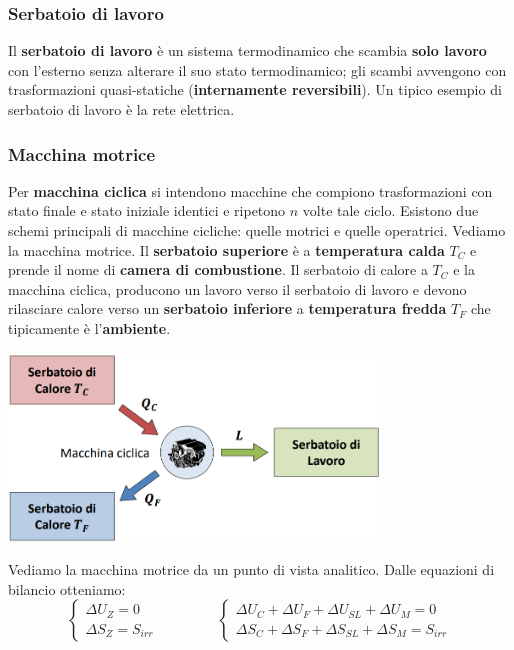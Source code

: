\subsubsection{Serbatoio di lavoro}
Il \textbf{serbatoio di lavoro} è un sistema termodinamico che scambia \textbf{solo lavoro} con l'esterno senza alterare il suo stato termodinamico; gli scambi avvengono con trasformazioni quasi-statiche (\textbf{internamente reversibili}).\newline
\newline
Un tipico esempio di serbatoio di lavoro è la rete elettrica.
\subsubsection{Macchina motrice}
Per \textbf{macchina ciclica} si intendono macchine che compiono trasformazioni con stato finale e stato iniziale identici e ripetono $n$ volte tale ciclo.\newline
\newline
Esistono due schemi principali di macchine cicliche: quelle motrici e quelle operatrici. Vediamo la macchina motrice. \newline
\newline
Il \textbf{serbatoio superiore} è a \textbf{temperatura calda} $T_C$ e prende il nome di \textbf{camera di combustione}.\newline
Il serbatoio di calore a $T_C$ e la macchina ciclica, producono un lavoro verso il serbatoio di lavoro e devono rilasciare calore verso un \textbf{serbatoio inferiore} a \textbf{temperatura fredda} $T_F$ che tipicamente è l'\textbf{ambiente}.
\begin{center}
    \includegraphics[height=5cm]{../L05/img2.PNG}
\end{center}
Vediamo la macchina motrice da un punto di vista analitico.\newline
Dalle equazioni di bilancio otteniamo:
\[
    \begin{cases}
        \Delta U_Z = 0\\ \Delta S_Z = S_{irr}
    \end{cases} \;\;\;\;\;\;\;\;\;\;\;\;\;\;\; \begin{cases}
        \Delta U_C + \Delta U_F + \Delta U_{SL} + \Delta U_M = 0 \\
        \Delta S_C + \Delta S_F + \Delta S_{SL} + \Delta S_M = S_{irr}
    \end{cases}
\]
